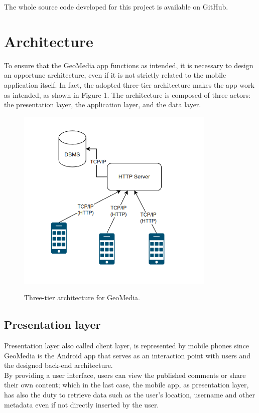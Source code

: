 \documentclass[conference]{IEEEtran}
\begin{document}
The whole source code developed for this project is available on GitHub. \cite{gh}


\section{Architecture}\label{Architecture:panoramic}

To ensure that the GeoMedia app functions as intended, it is necessary to design an opportune architecture, even if it is not strictly related to the mobile application itself.
In fact, the adopted three-tier architecture makes the app work as intended, as shown in Figure 1.
The architecture is composed of three actors: the presentation layer, the application layer, and the data layer.

\begin{figure}[htbp]
{\includegraphics[width=9.5cm]{imgs/Architecture.png}}
\caption{Three-tier architecture for GeoMedia.}
\label{fig}
\end{figure}


\subsection{Presentation layer}
Presentation layer also called client layer, is represented by mobile phones since GeoMedia is the Android app that serves as an interaction point with users and the designed back-end architecture.
\\
By providing a user interface, users can view the published comments or share their own content; which in the last case, the mobile app, as presentation layer, has also the duty to retrieve data such as the user's location, username and other metadata even if not directly inserted by the user.
\end{document}
